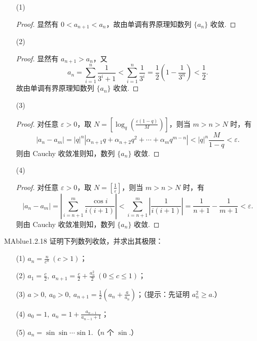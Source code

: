 \begin{enumerate}
    \item[(1)]
    \begin{proof}
        显然有 $0 < a_{n+1} < a_n$，故由单调有界原理知数列 $\{ a_n \}$ 收敛.
    \end{proof}
    \item[(2)]
    \begin{proof}
        显然有 $a_{n+1} > a_n$，又
        \[
            a_n = \sum_{i=1}^n \frac 1 {3^i+1} < \sum_{i=1}^n \frac 1 {3^i} = \frac 1 2 \left( 1 - \frac 1 {3^n} \right) < \frac 1 2.
        \]
        故由单调有界原理知数列 $\{ a_n \}$ 收敛.
    \end{proof}
    \item[(3)]
    \begin{proof}
        对任意 $\varepsilon > 0$，取 $N = \left[ \log_q \left( \frac {\varepsilon (1-q)} M \right) \right]$，则当 $m > n > N$ 时，有
        \[
            |a_n - a_m| = |q|^n |\alpha_{n+1} q + \alpha_{n+2} q^2 + \cdots + \alpha_m q^{m-n}| < |q|^n \frac M {1-q} < \varepsilon.
        \]
        则由 Cauchy 收敛准则知，数列 $\{ a_n \}$ 收敛.
    \end{proof}
    \item[(4)]
    \begin{proof}
        对任意 $\varepsilon > 0$，取 $N = \left[ \frac 1 \varepsilon \right]$，则当 $m > n > N$ 时，有
        \[
            |a_n - a_m| = \left| \sum_{i=n+1}^m \frac{\cos i}{i(i+1)} \right| < \sum_{i=n+1}^m \left| \frac 1 {i(i+1)} \right| = \frac 1 {n+1} - \frac 1 {m+1} < \varepsilon.
        \]
        则由 Cauchy 收敛准则知，数列 $\{ a_n \}$ 收敛.
    \end{proof}
\end{enumerate}

\begin{problem}{MAblue}{1.2.18}
    证明下列数列收敛，并求出其极限：
    \begin{enumerate}
        \item[(1)]
        $a_n = \frac n {c^n} \ (c > 1)$；
        \item[(2)]
        $a_1 = \frac c 2,\ a_{n+1} = \frac c 2 + \frac {a_n^2} 2 \ (0 \leqslant c \leqslant 1)$；
        \item[(3)]
        $a > 0,\ a_0 > 0,\ a_{n+1} = \frac 1 2 \left( a_n + \frac a {a_n} \right)$；（提示：先证明 $a_n^2 \geqslant a$.）
        \item[(4)]
        $a_0 = 1,\ a_n = 1 + \frac{a_{n-1}}{a_{n-1}+1}$；
        \item[(5)]
        $a_n = \sin \sin \cdots \sin 1$.（$n$ 个 $\sin$.）
    \end{enumerate}
\end{problem}

